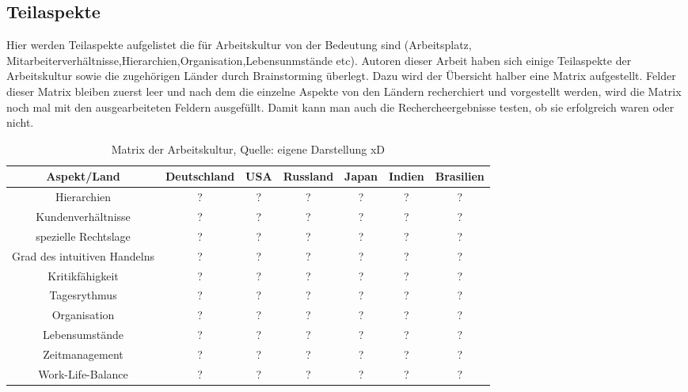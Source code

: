\subsection{Teilaspekte}
	Hier werden Teilaspekte aufgelistet die für Arbeitskultur von der Bedeutung sind (Arbeitsplatz, Mitarbeiterverhältnisse,Hierarchien,Organisation,Lebensunmstände etc).
	Autoren dieser Arbeit haben sich einige Teilaspekte der Arbeitskultur sowie die zugehörigen Länder durch Brainstorming überlegt. Dazu wird der Übersicht halber eine Matrix aufgestellt. Felder dieser Matrix bleiben zuerst leer und nach dem die einzelne Aspekte von den Ländern recherchiert und vorgestellt werden, wird die Matrix noch mal mit den ausgearbeiteten Feldern ausgefüllt. Damit kann man auch die Rechercheergebnisse testen, ob sie erfolgreich waren oder nicht.\\

\begin{table}[htp]
\begin{tabular}{|c|c|c|c|c|c|c|}
\hline  Aspekt/Land& Deutschland & USA & Russland & Japan & Indien & Brasilien \\ 
\hline 	Hierarchien  & ? & ? & ? & ? & ? & ? \\ 
\hline  Kundenverhältnisse& ? & ? & ? & ? & ? & ? \\ 
\hline  spezielle Rechtslage& ? & ? & ? & ? & ? & ? \\ 
\hline  Grad des intuitiven Handelns& ? & ? & ? & ? & ? & ? \\ 
\hline  Kritikfähigkeit& ? & ? & ? & ? & ? & ? \\ 
\hline  Tagesrythmus& ? & ? & ? & ? & ? & ? \\ 
\hline  Organisation& ? & ? & ? & ? & ? & ? \\ 
\hline  Lebensumstände& ? & ? & ? & ? & ? & ? \\ 
\hline  Zeitmanagement& ? & ? & ? & ? & ? & ? \\ 
\hline  Work-Life-Balance& ? & ? & ? & ? & ? & ? \\ 
\hline 
\end{tabular} 
\caption{Matrix der Arbeitskultur, Quelle: eigene Darstellung xD}
\end{table}
\newpage
